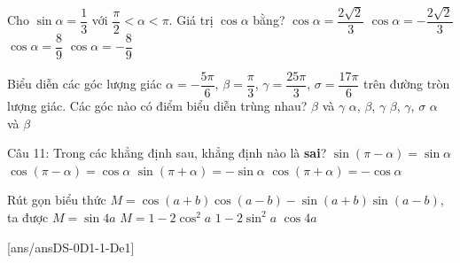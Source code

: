 \begin{ex}%
	Cho $\sin \alpha =\dfrac{1}{3}$ với $\dfrac{\pi}{2}<\alpha<\pi$. Giá trị $\cos \alpha$ bằng?
	\choice
	{$\cos \alpha=\dfrac{2\sqrt{2}}{3}$}
	{$\cos \alpha=-\dfrac{2\sqrt{2}}{3}$}
	{$\cos \alpha=\dfrac{8}{9}$}
	{\True $\cos \alpha=-\dfrac{8}{9}$}
\end{ex}
\begin{ex}%
	Biểu diễn các góc lượng giác $\alpha=-\dfrac{5\pi}{6}$, $\beta=\dfrac{\pi}{3}$, $\gamma=\dfrac{25\pi}{3}$, $\sigma=\dfrac{17\pi}{6}$ trên đường tròn lượng giác. Các góc nào có điểm biểu diễn trùng nhau?
	\choice
	{\True $\beta$ và $\gamma$}
	{$\alpha$, $\beta$, $\gamma$}
	{$\beta$, $\gamma$, $\sigma$}
	{$\alpha$ và $\beta$}
\end{ex}
\begin{ex}%
	Câu 11:	Trong các khẳng định sau, khẳng định nào là \textbf{sai}?
	\choice
	{$\sin(\pi-\alpha)=\sin \alpha$}
	{\True $\cos(\pi-\alpha)=\cos \alpha$}
	{$\sin(\pi+\alpha)=-\sin \alpha$}
	{$\cos(\pi+\alpha)=-\cos \alpha$}
\end{ex}
\begin{ex}%
	Rút gọn biểu thức $M=\cos(a+b)\cos (a-b)-\sin(a+b)\sin(a-b)$, ta được
	\choice
	{$M=\sin{4a}$}
	{$M=1-2\cos ^2 a$}
	{\True $1-2\sin^2a$}
	{$\cos {4a}$}
\end{ex}
\TNTF
\setcounter{ex}{0}
[ans/ansDS-0D1-1-De1]
